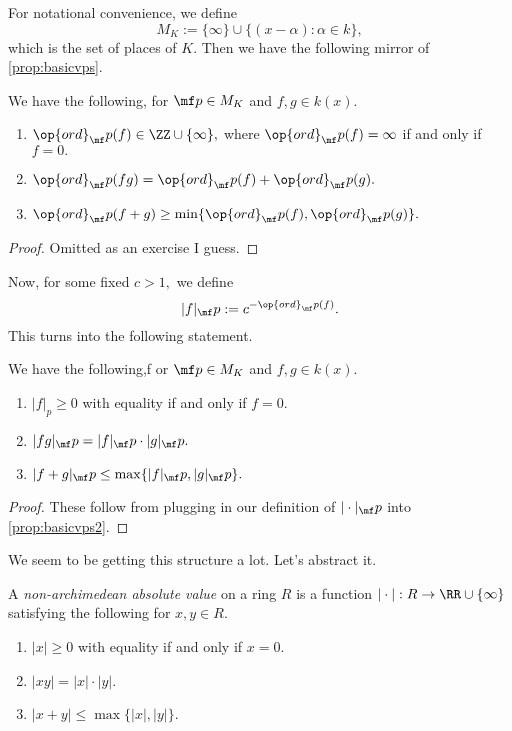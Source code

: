 \documentclass[../notes.tex]{subfiles}
\begin{document}
For notational convenience, we define
\[M_K:=\{\infty\}\cup\{(x-\alpha):\alpha\in k\},\]
which is the set of places of $K.$ Then we have the following mirror of \autoref{prop:basicvps}.
\begin{proposition} \label{prop:basicvps2}
	We have the following, for $\mf p\in M_K$ and $f,g\in k(x).$
	\begin{enumerate}[label=(\alph*)]
		\item $\op{ord}_\mf p(f)\in\ZZ\cup\{\infty\},$ where $\op{ord}_\mf p(f)=\infty$ if and only if $f=0.$
		\item $\op{ord}_\mf p(fg)=\op{ord}_\mf p(f)+\op{ord}_\mf p(g).$
		\item $\op{ord}_\mf p(f+g)\ge\min\{\op{ord}_\mf p(f),\op{ord}_\mf p(g)\}.$
	\end{enumerate}
\end{proposition}
\begin{proof}
	Omitted as an exercise I guess.\todo{}
\end{proof}
Now, for some fixed $c>1,$ we define
\[|f|_\mf p:=c^{-\op{ord}_\mf p(f)}.\]
This turns into the following statement.
\begin{corollary}
	We have the following,f or $\mf p\in M_K$ and $f,g\in k(x).$
	\begin{enumerate}[label=(\alph*)]
		\item $|f|_p\ge0$ with equality if and only if $f=0.$
		\item $|fg|_\mf p=|f|_\mf p\cdot|g|_\mf p.$
		\item $|f+g|_\mf p\le\max\{|f|_\mf p,|g|_\mf p\}.$
	\end{enumerate}
\end{corollary}
\begin{proof}
	These follow from plugging in our definition of $|\cdot|_\mf p$ into \autoref{prop:basicvps2}.
\end{proof}
We seem to be getting this structure a lot. Let's abstract it.
\begin{definition}
	A \textit{non-archimedean absolute value} on a ring $R$ is a function $|\cdot|:R\to\RR\cup\{\infty\}$ satisfying the following for $x,y\in R.$
	\begin{enumerate}
		\item $|x|\ge0$ with equality if and only if $x=0.$
		\item $|xy|=|x|\cdot|y|.$
		\item $|x+y|\le\max\{|x|,|y|\}.$
	\end{enumerate}
\end{definition}
\end{document}
